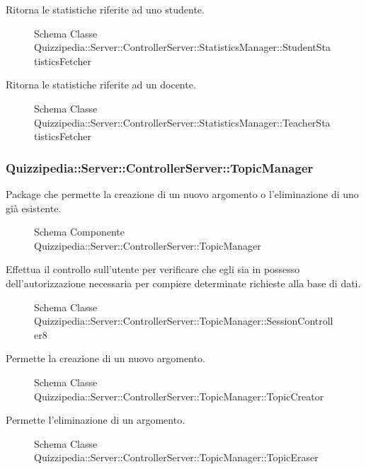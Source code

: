 Ritorna le statistiche riferite ad uno studente.
\begin{figure}[H]
\centering
\noindent{}
\caption{Schema Classe Quizzipedia::Server::ControllerServer::StatisticsManager::StudentStatisticsFetcher}
\end{figure}
Ritorna le statistiche riferite ad un docente.
\begin{figure}[H]
\centering
\noindent{}
\caption{Schema Classe Quizzipedia::Server::ControllerServer::StatisticsManager::TeacherStatisticsFetcher}
\end{figure}
\subsubsection{Quizzipedia::Server::ControllerServer::TopicManager}
Package che permette la creazione di un nuovo argomento o l'eliminazione di uno già esistente.
\begin{figure}[H]
\centering
\noindent{}
\caption{Schema Componente Quizzipedia::Server::ControllerServer::TopicManager}
\end{figure}
Effettua il controllo sull'utente per verificare che egli sia in possesso dell'autorizzazione necessaria per compiere determinate richieste alla base di dati.
\begin{figure}[H]
\centering
\noindent{}
\caption{Schema Classe Quizzipedia::Server::ControllerServer::TopicManager::SessionController8}
\end{figure}
Permette la creazione di un nuovo argomento.
\begin{figure}[H]
\centering
\noindent{}
\caption{Schema Classe Quizzipedia::Server::ControllerServer::TopicManager::TopicCreator}
\end{figure}
Permette l'eliminazione di un argomento.
\begin{figure}[H]
\centering
\noindent{}
\caption{Schema Classe Quizzipedia::Server::ControllerServer::TopicManager::TopicEraser}
\end{figure}
